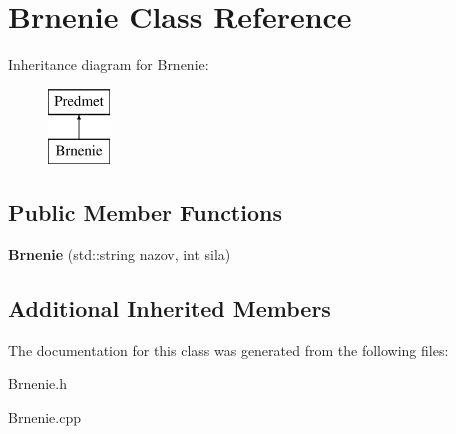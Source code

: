 \hypertarget{class_brnenie}{\section{Brnenie Class Reference}
\label{class_brnenie}
}
Inheritance diagram for Brnenie\-:\begin{figure}[H]
\begin{center}
\leavevmode
\includegraphics[height=2.000000cm]{class_brnenie}
\end{center}
\end{figure}
\subsection*{Public Member Functions}
\begin{DoxyCompactItemize}
\item 
\hypertarget{class_brnenie_aa87a26f8c7f3c7616a2f2c092ce60514}{{\bfseries Brnenie} (std\-::string nazov, int sila)}\label{class_brnenie_aa87a26f8c7f3c7616a2f2c092ce60514}

\end{DoxyCompactItemize}
\subsection*{Additional Inherited Members}


The documentation for this class was generated from the following files\-:\begin{DoxyCompactItemize}
\item 
Brnenie.\-h\item 
Brnenie.\-cpp\end{DoxyCompactItemize}
